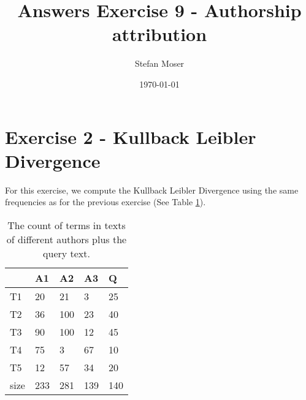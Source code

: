 \documentclass[11pt]{article}
\title{\textbf{Answers Exercise 9 - Authorship attribution}}
\author{Stefan Moser}
\date{\today}
\begin{document}
\maketitle

\section*{Exercise 2 - Kullback Leibler Divergence}
For this exercise, we compute the Kullback Leibler Divergence using the same frequencies
as for the previous exercise (See Table \ref{table:count}). 
\begin{table}[h]
\center
\begin{tabular}{|l|l|l|l|l|}
\hline
	 & A1 & A2 & A3 & Q\\
\hline
	T1 & 20 & 21 & 3 & 25\\
\hline
	T2 & 36 & 100 & 23 & 40\\
\hline
	T3 & 90 & 100 & 12 & 45\\
\hline
	T4 & 75 & 3 & 67 & 10\\
\hline
	T5 & 12 & 57 & 34 & 20\\
\hline
	size & 233 & 281 & 139 & 140\\
\hline
\end{tabular}
\caption{The count of terms in texts of different authors plus the query text.}
\label{table:count}
\end{table}
\end{document}
